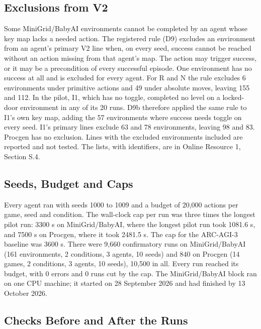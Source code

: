 \documentclass[twocolumn]{svjour3}
\begin{document}
\subsection{Exclusions from V2}\label{sec:exclusions}

Some MiniGrid/BabyAI environments cannot be completed by an agent whose
key map lacks a needed action. The registered rule (D9) excludes an
environment from an agent's primary V2 line when, on every seed, success
cannot be reached without an action missing from that agent's map. The
action may trigger success, or it may be a precondition of every
successful episode. One environment has no success at all and is
excluded for every agent. For R and N the rule excludes 6 environments
under primitive actions and 49 under absolute moves, leaving 155 and
112. In the pilot, I1, which has no toggle, completed no level on a
locked-door environment in any of its 20 runs. D9b therefore applied the
same rule to I1's own key map, adding the 57 environments where success
needs toggle on every seed. I1's primary lines exclude 63 and 78
environments, leaving 98 and 83. Procgen has no exclusion. Lines with
the excluded environments included are reported and not tested. The
lists, with identifiers, are in Online Resource 1, Section S.4.

\subsection{Seeds, Budget and Caps}\label{sec:seeds}

Every agent ran with seeds 1000 to 1009 and a budget of 20,000 actions
per game, seed and condition. The wall-clock cap per run was three times
the longest pilot run: 3300 s on MiniGrid/BabyAI, where the longest
pilot run took 1081.6 s, and 7500 s on Procgen, where it took 2481.5 s.
The cap for the ARC-AGI-3 baseline was 3600 s. There were 9,660
confirmatory runs on MiniGrid/BabyAI (161 environments, 2 conditions, 3
agents, 10 seeds) and 840 on Procgen (14 games, 2 conditions, 3 agents,
10 seeds), 10,500 in all. Every run reached its budget, with 0 errors
and 0 runs cut by the cap. The MiniGrid/BabyAI block ran on one CPU
machine; it started on 28 September 2026 and had finished by 13 October
2026.

\subsection{Checks Before and After the Runs}\label{sec:checks}
\end{document}

